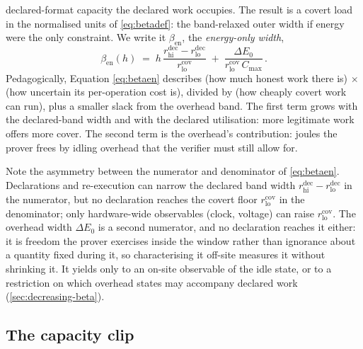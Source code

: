 \documentclass{article}
\theoremstyle{plain}
\theoremstyle{definition}
\theoremstyle{remark}
\begin{document}
declared-format capacity the declared work occupies. The result is a covert load in the
normalised units of \cref{eq:betadef}: the band-relaxed outer width if energy
were the only constraint. We write it $\beta_{\mathrm{en}}$, the
\emph{energy-only width},
\begin{equation}
\;\beta_{\mathrm{en}}(h) \;=\; h\,
		\frac{r_{\mathrm{hi}}^{\mathrm{dec}} - r_{\mathrm{lo}}^{\mathrm{dec}}}{r_{\mathrm{lo}}^{\mathrm{cov}}}
		\;+\; \frac{\Delta E_0}{r_{\mathrm{lo}}^{\mathrm{cov}}\,C_{\max}}\,.\;
	\label{eq:betaen}
\end{equation}
Pedagogically, Equation \eqref{eq:betaen} describes (how much honest work there is) $\times$ (how uncertain its
per-operation cost is), divided by (how cheaply covert work can run), plus a
smaller slack from the overhead band. The first term grows with the
declared-band width and with the declared utilisation: more legitimate work
offers more cover. The second term is the overhead's contribution: joules
the prover frees by idling overhead that the verifier must still allow for.

Note the asymmetry between the numerator and denominator of \cref{eq:betaen}.
Declarations and re-execution can narrow the declared band width
$r_{\mathrm{hi}}^{\mathrm{dec}} - r_{\mathrm{lo}}^{\mathrm{dec}}$ in the
numerator, but no declaration reaches the covert floor
$r_{\mathrm{lo}}^{\mathrm{cov}}$ in the denominator; only hardware-wide
observables (clock, voltage) can raise $r_{\mathrm{lo}}^{\mathrm{cov}}$. The
overhead width $\Delta E_0$ is a second numerator, and no declaration reaches
it either: it is freedom the prover exercises inside the window rather than
ignorance about a quantity fixed during it, so characterising it off-site
measures it without shrinking it. It yields only to an on-site observable of
the idle state, or to a restriction on which overhead states may accompany
declared work (\cref{sec:decreasing-beta}).

\subsection{The capacity clip}
\label{subsec:capclip}
\end{document}
